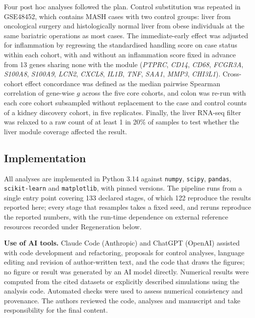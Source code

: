 \documentclass[pdflatex,sn-vancouver-num]{sn-jnl}
\theoremstyle{thmstyleone}
\theoremstyle{thmstyletwo}
\theoremstyle{thmstylethree}
\begin{document}
Four post hoc analyses followed the plan. Control substitution was repeated in GSE48452, which
contains MASH cases with two control groups: liver from oncological surgery and histologically
normal liver from obese individuals at the same bariatric operations as most cases. The
immediate-early effect was adjusted for inflammation by regressing the standardised handling
score on case status within each cohort, with and without an inflammation score fixed in advance
from 13 genes sharing none with the module (\textit{PTPRC}, \textit{CD14}, \textit{CD68},
\textit{FCGR3A}, \textit{S100A8}, \textit{S100A9}, \textit{LCN2}, \textit{CXCL8}, \textit{IL1B},
\textit{TNF}, \textit{SAA1}, \textit{MMP3}, \textit{CHI3L1}). Cross-cohort effect concordance
was defined as the median pairwise Spearman correlation of gene-wise $g$ across the five core
cohorts, and colon was re-run with each core cohort subsampled without replacement to the case and
control counts of a kidney discovery cohort, in five replicates. Finally, the liver RNA-seq filter
was relaxed to a raw count of at least 1 in 20\% of samples to test whether the liver module
coverage affected the result.

\subsection{Implementation}\label{sec:implementation}

All analyses are implemented in Python 3.14 against \texttt{numpy}, \texttt{scipy},
\texttt{pandas}, \texttt{scikit-learn} and \texttt{matplotlib}, with pinned versions. The
pipeline runs from a single entry point covering 133 declared stages, of which 122 reproduce the
results reported here; every stage that resamples takes a fixed seed, and reruns reproduce the
reported numbers, with the run-time dependence on external reference resources recorded
under Regeneration below.

\textbf{Use of AI tools.} Claude Code (Anthropic) and ChatGPT (OpenAI) assisted with code
development and refactoring, proposals for control analyses, language editing and revision of
author-written text, and the code that draws the figures; no figure or result was generated by
an AI model directly. Numerical results were computed from the cited datasets or explicitly
described simulations using the analysis code. Automated checks were used to assess numerical
consistency and provenance. The authors reviewed the code, analyses and manuscript and take
responsibility for the final content.
\end{document}
